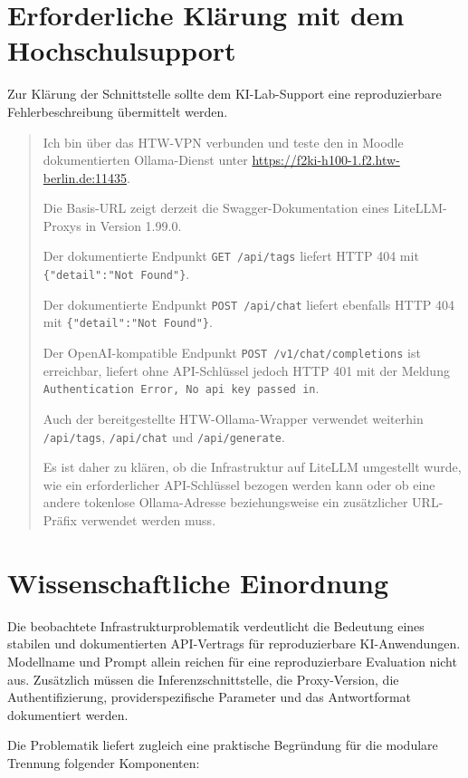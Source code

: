 \documentclass[11pt,a4paper,oneside,ngerman]{memoir}
\begin{document}
\chapter{Erforderliche Klärung mit dem Hochschulsupport}

Zur Klärung der Schnittstelle sollte dem KI-Lab-Support eine reproduzierbare Fehlerbeschreibung übermittelt werden.

\begin{quote}
Ich bin über das HTW-VPN verbunden und teste den in Moodle dokumentierten Ollama-Dienst unter
\url{https://f2ki-h100-1.f2.htw-berlin.de:11435}.

Die Basis-URL zeigt derzeit die Swagger-Dokumentation eines LiteLLM-Proxys in Version 1.99.0.

Der dokumentierte Endpunkt \texttt{GET /api/tags} liefert HTTP 404 mit \texttt{\{"detail":"Not Found"\}}.

Der dokumentierte Endpunkt \texttt{POST /api/chat} liefert ebenfalls HTTP 404 mit \texttt{\{"detail":"Not Found"\}}.

Der OpenAI-kompatible Endpunkt \texttt{POST /v1/chat/completions} ist erreichbar, liefert ohne API-Schlüssel jedoch HTTP 401 mit der Meldung \texttt{Authentication Error, No api key passed in}.

Auch der bereitgestellte HTW-Ollama-Wrapper verwendet weiterhin \texttt{/api/tags}, \texttt{/api/chat} und \texttt{/api/generate}.

Es ist daher zu klären, ob die Infrastruktur auf LiteLLM umgestellt wurde, wie ein erforderlicher API-Schlüssel bezogen werden kann oder ob eine andere tokenlose Ollama-Adresse beziehungsweise ein zusätzlicher URL-Präfix verwendet werden muss.
\end{quote}

\chapter{Wissenschaftliche Einordnung}

Die beobachtete Infrastrukturproblematik verdeutlicht die Bedeutung eines stabilen und dokumentierten API-Vertrags für reproduzierbare KI-Anwendungen. Modellname und Prompt allein reichen für eine reproduzierbare Evaluation nicht aus. Zusätzlich müssen die Inferenzschnittstelle, die Proxy-Version, die Authentifizierung, providerspezifische Parameter und das Antwortformat dokumentiert werden.

Die Problematik liefert zugleich eine praktische Begründung für die modulare Trennung folgender Komponenten:
\end{document}
